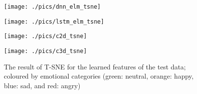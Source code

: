 \documentclass[conference, compsoc, twoside]{IEEEtran}
\begin{document}
\begin{figure}[!th]
\begin{minipage}[b]{0.48\linewidth}
  \centerline{\texttt{[image: ./pics/dnn\_elm\_tsne]}}
\end{minipage}
\begin{minipage}[b]{0.48\linewidth}
  \centerline{\texttt{[image: ./pics/lstm\_elm\_tsne]}}
\end{minipage}
\begin{minipage}[b]{0.48\linewidth}
  \centerline{\texttt{[image: ./pics/c2d\_tsne]}}
\end{minipage}
\begin{minipage}[b]{0.48\linewidth}
  \centerline{\texttt{[image: ./pics/c3d\_tsne]}}
\end{minipage}
\caption{The result of T-SNE for the learned features of the test data; coloured by emotional categories (green: neutral, orange: happy, blue: sad, and red: angry)}
\label{fig:tsne}
\end{figure}
\end{document}

